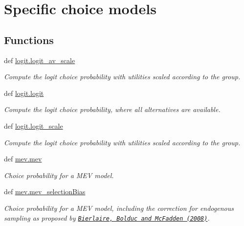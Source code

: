 \hypertarget{group__models}{\section{Specific choice models}
\label{group__models}
}
\subsection*{Functions}
\begin{DoxyCompactItemize}
\item 
def \hyperlink{group__models_gaa1fe1d39643113961336001852bd9847}{logit.\+logit\+\_\+av\+\_\+scale}
\begin{DoxyCompactList}\small\item\em Compute the logit choice probability with utilities scaled according to the group. \end{DoxyCompactList}\item 
def \hyperlink{group__models_gaa78a7685299279e172947a45f3b31a8f}{logit.\+logit}
\begin{DoxyCompactList}\small\item\em Compute the logit choice probability, where all alternatives are available. \end{DoxyCompactList}\item 
def \hyperlink{group__models_gaa9c3a2702105789a7f4e7c56128072df}{logit.\+logit\+\_\+scale}
\begin{DoxyCompactList}\small\item\em Compute the logit choice probability with utilities scaled according to the group. \end{DoxyCompactList}\item 
def \hyperlink{group__models_ga9f62049fa1c5836071328e800dbc30dd}{mev.\+mev}
\begin{DoxyCompactList}\small\item\em Choice probability for a M\+E\+V model. \end{DoxyCompactList}\item 
def \hyperlink{group__models_gaa009fc631ba3993ae2092ef250dbb68f}{mev.\+mev\+\_\+selection\+Bias}
\begin{DoxyCompactList}\small\item\em Choice probability for a M\+E\+V model, including the correction for endogenous sampling as proposed by \href{http://dx.doi.org/10.1016/j.trb.2007.09.003}{\tt Bierlaire, Bolduc and Mc\+Fadden (2008)}. \end{DoxyCompactList}\end{DoxyCompactItemize}


